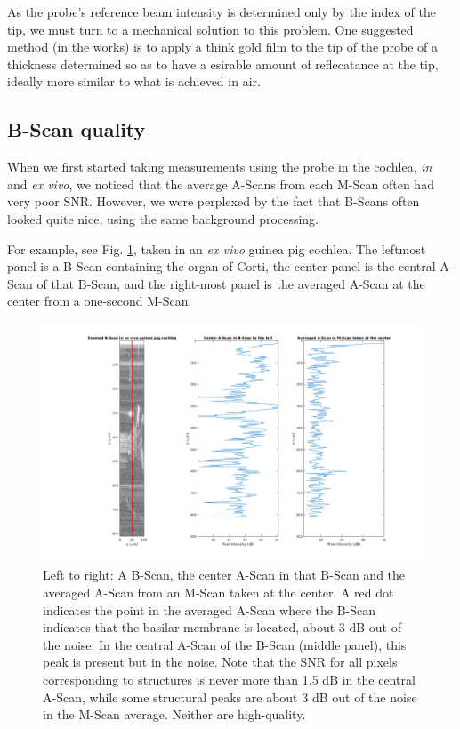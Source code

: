 \documentclass{article}
\begin{document}
\par{As the probe's reference beam intensity is determined only by the index of the tip, we must turn to a mechanical solution to this problem. One suggested method (in the works) is to apply a think gold film to the tip of the probe of a thickness determined so as to have a esirable amount of reflecatance at the tip, ideally more similar to what is achieved in air.}

\subsection{B-Scan quality}\label{BScansection}
\hypertarget{BScansection}{}

\par{When we first started taking measurements using the probe in the cochlea, \textit{in} and \textit{ex vivo}, we noticed that the average A-Scans from each M-Scan often had very poor SNR. However, we were perplexed by the fact that B-Scans often looked quite nice, using the same background processing.}

\par{For example, see Fig. \ref{bvsa}, taken in an \textit{ex vivo} guinea pig cochlea. The leftmost panel is a B-Scan containing the organ of Corti, the center panel is the central A-Scan of that B-Scan, and the right-most panel is the averaged A-Scan at the center from a one-second M-Scan.}

\begin{figure}[!h]
	\centering
	\includegraphics[width=\textwidth]{Data for Probe Writeup/Data 2022-2-17/BScan v AScan.png}
	\caption{Left to right: A B-Scan, the center A-Scan in that B-Scan and the averaged A-Scan from an M-Scan taken at the center. A red dot indicates the point in the averaged A-Scan where the B-Scan indicates that the basilar membrane is located, about 3 dB out of the noise. In the central A-Scan of the B-Scan (middle panel), this peak is present but in the noise. Note that the SNR for all pixels corresponding to structures is never more than 1.5 dB in the central A-Scan, while some structural peaks are about 3 dB out of the noise in the M-Scan average. Neither are high-quality.}\label{bvsa}
\end{figure}
\end{document}
